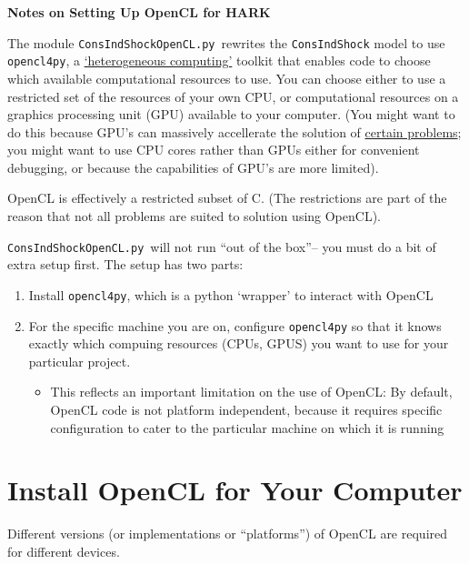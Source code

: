 \documentclass[12pt,pdftex,letterpaper]{article}
\begin{document}
\centerline{\LARGE \bf Notes on Setting Up OpenCL for HARK} \medskip\medskip



\newcommand{\CISOCL}{\texttt{ConsIndShockOpenCL.py}~}
\newcommand{\oclpy}{\texttt{opencl4py}}
  
The module \CISOCL rewrites the \texttt{ConsIndShock} model to use \oclpy, a \href{https://en.wikipedia.org/wiki/Heterogeneous_computing}{`heterogeneous computing'} toolkit that enables code to choose which available computational resources to use.  You can choose either to use a restricted set of the resources of your own CPU, or computational resources on a graphics processing unit (GPU) available to your computer.  (You might want to do this because GPU's can massively accellerate the solution of \href{https://scicomp.stackexchange.com/questions/943/what-kinds-of-problems-lend-themselves-well-to-gpu-computing}{certain problems}; you might want to use CPU cores rather than GPUs either for convenient debugging, or because the capabilities of GPU's are more limited).  

OpenCL is effectively a restricted subset of C.  (The restrictions are part of the reason that not all problems are suited to solution using OpenCL).

\CISOCL will not run ``out of the box''-- you must do a bit of extra setup first.  The setup has two parts:
\begin{enumerate}
\item Install {\oclpy}, which is a python `wrapper' to interact with OpenCL
\item For the specific machine you are on, configure {\oclpy} so that it knows exactly which compuing resources (CPUs, GPUS) you want to use for your particular project. 
  \begin{itemize}
  \item This reflects an important limitation on the use of OpenCL:  By default, OpenCL code is not platform independent, because it requires specific configuration to cater to the particular machine on which it is running
  \end{itemize}
\end{enumerate}

\section{Install OpenCL for Your Computer}
Different versions (or implementations or ``platforms'') of OpenCL are required for different devices.
\end{document}
